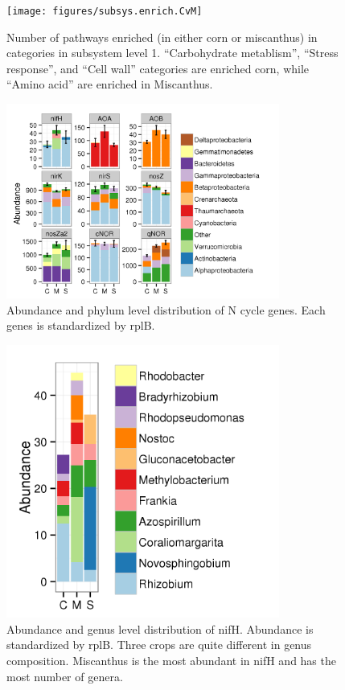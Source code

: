 \documentclass[12pt]{article}
\begin{document}
{    \begin{figure}[tbph!]
    \centering
    \texttt{[image: figures/subsys.enrich.CvM]}
    \caption[Number of pathways enriched in categories in subsystem level 1]{Number of pathways enriched (in either corn or miscanthus) in categories in subsystem level 1. ``Carbohydrate metablism'', ``Stress response'', and ``Cell wall'' categories are enriched corn, while ``Amino acid'' are enriched in Miscanthus.}
    \label{fig:subsys.enrich.CvM}
    \end{figure}


    \begin{figure}[tbph!]
    \centering
    \includegraphics[width=0.8\textwidth]{figures/xander.ncycle.abun}
    \caption[Abundance and phylum level distribution of N cycle genes]{Abundance and phylum level distribution of N cycle genes. Each genes is standardized by rplB.}
    \label{fig:xander.ncycle.abun}
    \end{figure}


    \begin{figure}[tbph!]
    \centering
    \includegraphics[width=0.8\textwidth]{figures/xander.nifH.genus}
    \caption[Abundance and genus level distribution of nifH]{Abundance and genus level distribution of nifH. Abundance is standardized by rplB. Three crops are quite different in genus composition. Miscanthus is the most abundant in nifH and has the most number of genera.}
    \label{fig:xander.nifH.genus}
    \end{figure}


}
\end{document}
